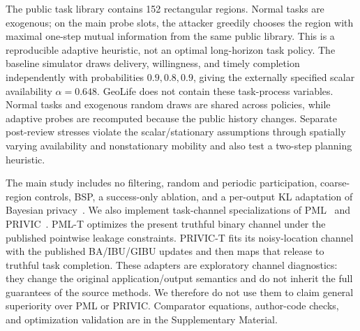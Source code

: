 \documentclass[10pt,journal,compsoc]{IEEEtran}
\begin{document}
The public task library contains 152 rectangular regions. Normal tasks are exogenous; on the main probe slots, the attacker greedily chooses the region with maximal one-step mutual information from the same public library. This is a reproducible adaptive heuristic, not an optimal long-horizon task policy. The baseline simulator draws delivery, willingness, and timely completion independently with probabilities \(0.9,0.8,0.9\), giving the externally specified scalar availability \(\alpha=0.648\). GeoLife does not contain these task-process variables. Normal tasks and exogenous random draws are shared across policies, while adaptive probes are recomputed because the public history changes. Separate post-review stresses violate the scalar/stationary assumptions through spatially varying availability and nonstationary mobility and also test a two-step planning heuristic.

The main study includes no filtering, random and periodic participation, coarse-region controls, BSP, a success-only ablation, and a per-output KL adaptation of Bayesian privacy~\cite{bayesian}. We also implement task-channel specializations of PML~\cite{pml2024} and PRIVIC~\cite{privic2024}. PML-T optimizes the present truthful binary channel under the published pointwise leakage constraints. PRIVIC-T fits its noisy-location channel with the published BA/IBU/GIBU updates and then maps that release to truthful task completion. These adapters are exploratory channel diagnostics: they change the original application/output semantics and do not inherit the full guarantees of the source methods. We therefore do not use them to claim general superiority over PML or PRIVIC. Comparator equations, author-code checks, and optimization validation are in the Supplementary Material.
\end{document}
